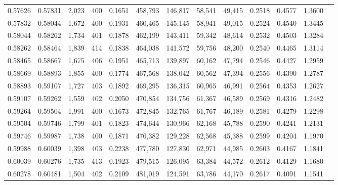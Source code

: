 \begin{tabular}{rrrrrrrrrrrrr}
0.57626 & 0.57831 &  2,023 &   400 &                                     0.1651 & 458,793 & 146,817 &  58,541 &  49,415 & 0.2518 & 0.4577 & 1.3600 \\
0.57832 & 0.58044 &  1,672 &   400 &                                     0.1931 & 460,465 & 145,145 &  58,941 &  49,015 & 0.2524 & 0.4540 & 1.3445 \\
0.58044 & 0.58262 &  1,734 &   401 &                                     0.1878 & 462,199 & 143,411 &  59,342 &  48,614 & 0.2532 & 0.4503 & 1.3284 \\
0.58262 & 0.58464 &  1,839 &   414 &                                     0.1838 & 464,038 & 141,572 &  59,756 &  48,200 & 0.2540 & 0.4465 & 1.3114 \\
0.58465 & 0.58667 &  1,675 &   406 &                                     0.1951 & 465,713 & 139,897 &  60,162 &  47,794 & 0.2546 & 0.4427 & 1.2959 \\
0.58669 & 0.58893 &  1,855 &   400 &                                     0.1774 & 467,568 & 138,042 &  60,562 &  47,394 & 0.2556 & 0.4390 & 1.2787 \\
0.58893 & 0.59107 &  1,727 &   403 &                                     0.1892 & 469,295 & 136,315 &  60,965 &  46,991 & 0.2564 & 0.4353 & 1.2627 \\
0.59107 & 0.59262 &  1,559 &   402 &                                     0.2050 & 470,854 & 134,756 &  61,367 &  46,589 & 0.2569 & 0.4316 & 1.2482 \\
0.59264 & 0.59504 &  1,991 &   400 &                                     0.1673 & 472,845 & 132,765 &  61,767 &  46,189 & 0.2581 & 0.4279 & 1.2298 \\
0.59504 & 0.59746 &  1,799 &   401 &                                     0.1823 & 474,644 & 130,966 &  62,168 &  45,788 & 0.2590 & 0.4241 & 1.2131 \\
0.59746 & 0.59987 &  1,738 &   400 &                                     0.1871 & 476,382 & 129,228 &  62,568 &  45,388 & 0.2599 & 0.4204 & 1.1970 \\
0.59988 & 0.60039 &  1,398 &   403 &                                     0.2238 & 477,780 & 127,830 &  62,971 &  44,985 & 0.2603 & 0.4167 & 1.1841 \\
0.60039 & 0.60276 &  1,735 &   413 &                                     0.1923 & 479,515 & 126,095 &  63,384 &  44,572 & 0.2612 & 0.4129 & 1.1680 \\
0.60278 & 0.60481 &  1,504 &   402 &                                     0.2109 & 481,019 & 124,591 &  63,786 &  44,170 & 0.2617 & 0.4091 & 1.1541 \\

\end{tabular}
